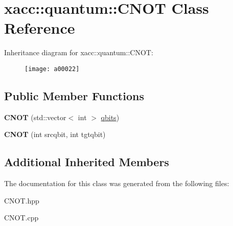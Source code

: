 \hypertarget{a00022}{}\section{xacc\+:\+:quantum\+:\+:C\+N\+OT Class Reference}
\label{a00022}
Inheritance diagram for xacc\+:\+:quantum\+:\+:C\+N\+OT\+:\begin{figure}[H]
\begin{center}
\leavevmode
\texttt{[image: a00022]}
\end{center}
\end{figure}
\subsection*{Public Member Functions}
\begin{DoxyCompactItemize}
\item 
{\bfseries C\+N\+OT} (std\+::vector$<$ int $>$ \hyperlink{a00042_a2a56be6c2519ea65df4d06f4abae1393}{qbits})\hypertarget{a00022_ad3d460779a27affa317dd4f3a88268b3}{}\label{a00022_ad3d460779a27affa317dd4f3a88268b3}

\item 
{\bfseries C\+N\+OT} (int srcqbit, int tgtqbit)\hypertarget{a00022_a15efcb44477dde4b6151fe1776a73ddc}{}\label{a00022_a15efcb44477dde4b6151fe1776a73ddc}

\end{DoxyCompactItemize}
\subsection*{Additional Inherited Members}


The documentation for this class was generated from the following files\+:\begin{DoxyCompactItemize}
\item 
C\+N\+O\+T.\+hpp\item 
C\+N\+O\+T.\+cpp\end{DoxyCompactItemize}
